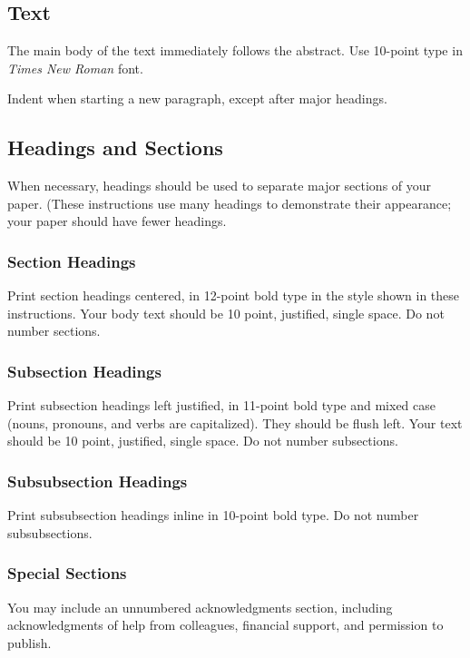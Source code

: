 \documentclass[letterpaper]{article}
\begin{document}
\subsection{Text}

The main body of the text immediately follows the abstract. Use 10-point type in {\em Times New Roman} font.

Indent when starting a new paragraph, except after major headings. 

\subsection{Headings and Sections}

When necessary, headings should be used to separate major sections of your paper. (These instructions use many headings to demonstrate their appearance; your paper should have fewer headings.

\subsubsection{Section Headings}

Print section headings centered, in 12-point bold type in the style shown in these instructions. Your body text should be 10 point, justified, single space. Do not number sections.

\subsubsection{Subsection Headings}

Print subsection headings left justified, in 11-point bold type and mixed case (nouns, pronouns, and verbs are capitalized). They should be flush left. Your text should be 10 point, justified, single space. Do not number subsections.

\subsubsection{Subsubsection Headings}

Print subsubsection headings inline in 10-point bold type. Do not number subsubsections.

\subsubsection{Special Sections}

You may include an unnumbered acknowledgments section, including acknowledgments of help from colleagues, financial support, and permission to publish.
\end{document}
